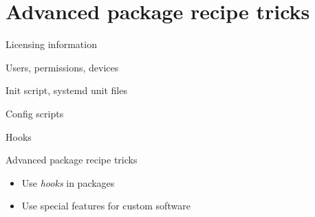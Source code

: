 \section{Advanced package recipe tricks}

\begin{frame}{Licensing information}


\end{frame}

\begin{frame}{Users, permissions, devices}


\end{frame}

\begin{frame}{Init script, systemd unit files}


\end{frame}

\begin{frame}{Config scripts}


\end{frame}

\begin{frame}{Hooks}

\end{frame}

\setuplabframe
{Advanced package recipe tricks}
{
  \begin{itemize}
  \item Use {\em hooks} in packages
  \item Use special features for custom software
  \end{itemize}
}
